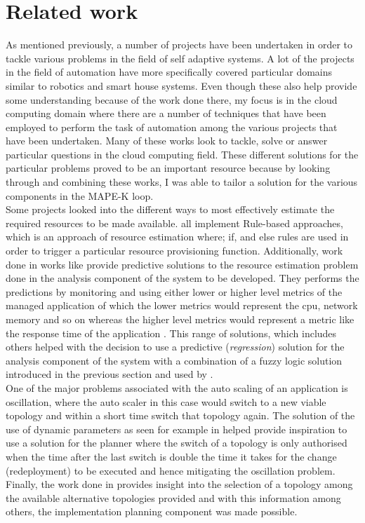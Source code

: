 \section{Related work}
As mentioned previously, a number of projects have been undertaken in order to tackle various problems in the field of self adaptive systems. A lot of the projects in the field of automation have more specifically covered particular domains similar to robotics and smart house systems. Even though these also help provide some understanding because of the work done there, my focus is in the cloud computing domain where there are a number of techniques that have been employed to perform the task of automation among the various projects that have been undertaken. Many of these works look to tackle, solve or answer particular questions in the cloud computing field. These different solutions for the particular problems proved to be an important resource because by looking through and combining these works, I was able to tailor a solution for the various components in the MAPE-K loop.
\\Some projects looked into the different ways to most effectively estimate the required resources to be made available.  \cite{amazon, dawoud2012elastic, al2013impact} all implement Rule-based approaches, which is an approach of resource estimation where; if, and else rules are used in order to trigger a particular resource provisioning function. Additionally, work done in works like \cite{yazdanov2012vertical, ghobaei2018autonomic, fang2012rpps}  provide predictive solutions to the resource estimation problem done in the analysis component of the system to be developed. They performs the predictions by monitoring and using either lower or higher level metrics of the managed application of which the lower metrics would represent the cpu, network memory and so on whereas the higher level metrics would represent a metric like the response time of the application \cite{qu2018auto}. This range of solutions, which includes others helped with the decision to use a predictive (\textit{regression}) solution for the analysis component of the system with a combination of a fuzzy logic solution introduced in the previous section and used by \cite{frey2014cloud}.
\\One of the major problems associated with the auto scaling of an application is oscillation, where the auto scaler in this case would switch to a new viable topology and within a short time switch that topology again\cite{qu2018auto}. The solution of the use of dynamic parameters as seen for example in \cite{lim2010automated} helped provide inspiration to use a solution for the planner where the switch of a topology is only authorised when the time after the last switch is double the time it takes for the change (redeployment) to be executed and hence mitigating the oscillation problem.  Finally, the work done in \cite{andrikopoulos2014optimal} provides insight into the selection of a topology among the available alternative topologies provided and with this information among others, the implementation planning component was made possible.

